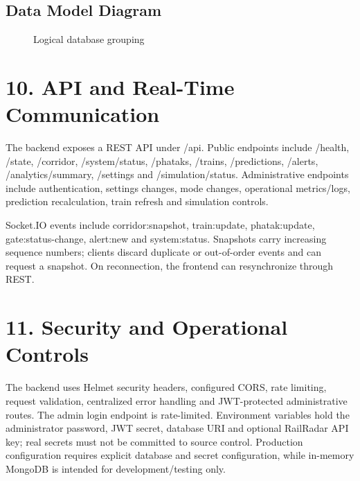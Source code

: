 \documentclass[12pt,a4paper]{report}
\begin{document}
\section{Data Model Diagram}
\begin{figure}[H]\centering
{}\caption{Logical database grouping}\end{figure}
\chapter{10. API and Real-Time Communication}
The backend exposes a REST API under /api. Public endpoints include /health, /state, /corridor, /system/status, /phataks, /trains, /predictions, /alerts, /analytics/summary, /settings and /simulation/status. Administrative endpoints include authentication, settings changes, mode changes, operational metrics/logs, prediction recalculation, train refresh and simulation controls.

Socket.IO events include corridor:snapshot, train:update, phatak:update, gate:status-change, alert:new and system:status. Snapshots carry increasing sequence numbers; clients discard duplicate or out-of-order events and can request a snapshot. On reconnection, the frontend can resynchronize through REST.

\chapter{11. Security and Operational Controls}
The backend uses Helmet security headers, configured CORS, rate limiting, request validation, centralized error handling and JWT-protected administrative routes. The admin login endpoint is rate-limited. Environment variables hold the administrator password, JWT secret, database URI and optional RailRadar API key; real secrets must not be committed to source control. Production configuration requires explicit database and secret configuration, while in-memory MongoDB is intended for development/testing only.
\end{document}
